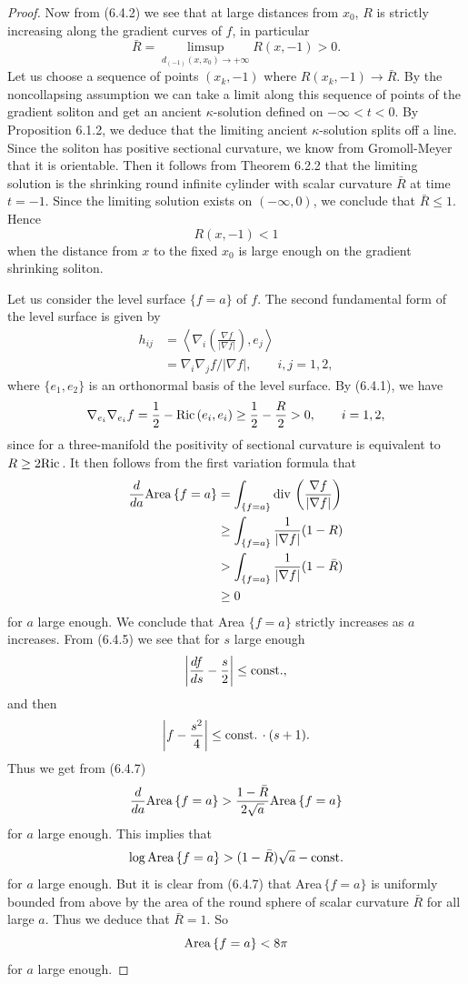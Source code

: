 \begin{proof}
Now from (6.4.2) we see that at large distances from $x_0$, $R$ is
strictly increasing along the gradient curves of $f$, in
particular
$$
\bar{R}=\limsup_{d_{(-1)}(x,x_0)\rightarrow+\infty}R(x,-1)>0.
$$
Let us choose a sequence of points $(x_k,-1)$ where
$R(x_k,-1)\rightarrow\bar{R}$. By the noncollapsing assumption we
can take a limit along this sequence of points of the gradient
soliton and get an ancient $\kappa$-solution defined on
$-\infty<t<0$. By Proposition 6.1.2, we deduce that the limiting
ancient $\kappa$-solution splits off a line. Since the soliton has
positive sectional curvature, we know from Gromoll-Meyer \cite{GM}
that it is orientable. Then it follows from Theorem 6.2.2 that the
limiting solution is the shrinking round infinite cylinder with
scalar curvature $\bar{R}$ at time $t=-1$. Since the limiting
solution exists on $(-\infty,0)$, we conclude that $\bar{R}\le 1$.
Hence
$$
R(x,-1)< 1
$$
when the distance from $x$ to the fixed $x_0$ is large enough on
the gradient shrinking soliton.

Let us consider the level surface $\{f=a\}$ of $f$. The second
fundamental form of the level surface is given by
\begin{align*}
h_{ij}&  = \left\langle\nabla_i\left(\frac{\nabla f}{|\nabla
f|}\right),e_j\right\rangle\\
&  = \nabla_i\nabla_j f/|\nabla f|,\qquad i,j=1,2,
\end{align*}
where $\{e_1,e_2\}$ is an orthonormal basis of the level surface.
By (6.4.1), we have
$$
\nabla_{e_i}\nabla_{e_i}f =\frac{1}{2}-{\rm Ric}\,(e_i,e_i)
\ge\frac{1}{2}-\frac{R}{2}>0,\qquad i=1,2,
$$
since for a three-manifold the positivity of sectional curvature
is equivalent to $R\ge 2{\rm Ric}\,$. It then follows from the first
variation formula that
\begin{align}
\frac{d}{da}{\rm Area}\,\{f=a\}
& = \int_{\{f=a\}}{\rm div}\,\left(\frac{\nabla f}{|\nabla f|}\right)\\
&  \ge \int_{\{f=a\}}\frac{1}{|\nabla f|}(1-R)\nonumber\\
&  > \int_{\{f=a\}}\frac{1}{|\nabla f|}(1-\bar{R})\nonumber\\
&  \ge 0\nonumber
\end{align}     %
for $a$ large enough. We conclude that Area $\{f=a\}$ strictly
increases as $a$ increases. From (6.4.5) we see that for $s$ large
enough
$$
\left|\frac{df}{ds}-\frac{s}{2}\right|\le{\rm const.},
$$
and then
$$
\left|f-\frac{s^2}{4}\right|\le {\rm const.}\,\cdot(s+1).
$$
Thus we get from (6.4.7)
$$
\frac{d}{da}{\rm Area}\,\{f=a\}
>\frac{1-\bar{R}}{2\sqrt{a}}{\rm Area}\,\{f=a\}
$$
for $a$ large enough. This implies that
$$
\log {\rm Area}\,\{f=a\}>(1-\bar{R})\sqrt{a}-{\rm const.}
$$
for $a$ large enough. But it is clear from (6.4.7) that
Area$\,\{f=a\}$ is uniformly bounded from above by the area of the
round sphere of scalar curvature $\bar{R}$ for all large $a$. Thus
we deduce that $\bar{R}=1$. So \begin{equation}
{\rm Area}\,\{f=a\}<8\pi  %
\end{equation} for $a$ large enough.


\end{proof}
